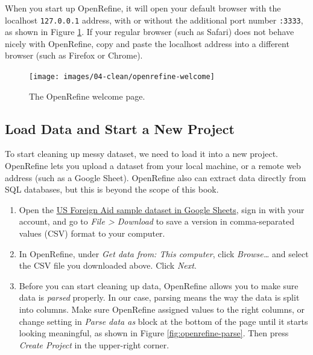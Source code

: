 \documentclass[
  english,
]{book}
\begin{document}
When you start up OpenRefine, it will open your default browser with the localhost \texttt{127.0.0.1} address, with or without the additional port number \texttt{:3333}, as shown in Figure \ref{fig:openrefine-welcome}. If your regular browser (such as Safari) does not behave nicely with OpenRefine, copy and paste the localhost address into a different browser (such as Firefox or Chrome).



\begin{figure}
\texttt{[image: images/04-clean/openrefine-welcome]} \caption{The OpenRefine welcome page.}\label{fig:openrefine-welcome}
\end{figure}

\hypertarget{load-data-and-start-a-new-project}{%
\subsection*{Load Data and Start a New Project}\label{load-data-and-start-a-new-project}}

To start cleaning up messy dataset, we need to load it into a new project. OpenRefine lets you upload a dataset from your local machine, or a remote web address (such as a Google Sheet). OpenRefine also can extract data directly from SQL databases, but this is beyond the scope of this book.

\begin{enumerate}
\def\labelenumi{\arabic{enumi}.}
\item
  Open the \href{https://docs.google.com/spreadsheets/d/19BilYJxd0fgi7MTAa2y9NUF65Xqf2_y_dVr1jPbmWeg/edit\#gid=1983762503}{US Foreign Aid sample dataset in Google Sheets}, sign in with your account, and go to \emph{File \textgreater{} Download} to save a version in comma-separated values (CSV) format to your computer.
\item
  In OpenRefine, under \emph{Get data from: This computer}, click \emph{Browse\ldots{}} and select the CSV file you downloaded above. Click \emph{Next}.
\item
  Before you can start cleaning up data, OpenRefine allows you to make sure data is \emph{parsed} properly.
  In our case, parsing means the way the data is split into columns. Make sure OpenRefine assigned values to the right columns, or change setting in \emph{Parse data as} block at the bottom of the page until it starts looking meaningful, as shown in Figure \ref{fig:openrefine-parse}. Then press \emph{Create Project} in the upper-right corner.
\end{enumerate}
\end{document}
